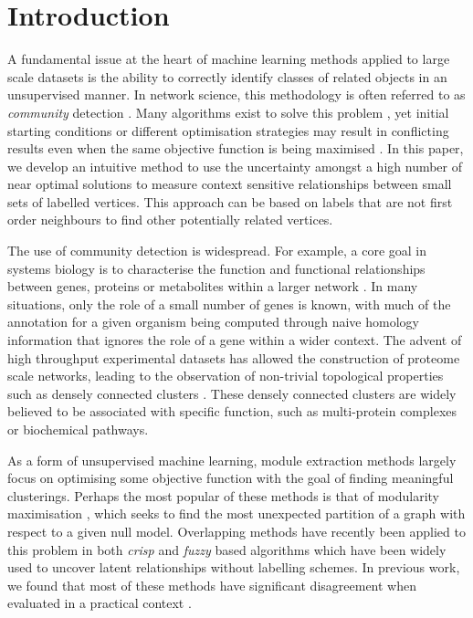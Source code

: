 \documentclass[sigconf]{acmart}
\begin{document}
\section{Introduction}
A fundamental issue at the heart of machine learning methods applied to large scale datasets is the ability to correctly identify classes of related objects in an unsupervised manner.
In network science, this methodology is often referred to as \textit{community} detection \cite{fortunato2016community}.
Many algorithms exist to solve this problem \cite{fortunato2016community}, yet initial starting conditions or different optimisation strategies may result in conflicting results even when the same objective function is being maximised \cite{good2010performance}.
In this paper, we develop an intuitive method to use the uncertainty amongst a high number of near optimal solutions to measure context sensitive relationships between small sets of labelled vertices.
This approach can be based on labels that are not first order neighbours to find other potentially related vertices.

The use of community detection is widespread.
For example, a core goal in systems biology is to characterise the function and functional relationships between genes, proteins or metabolites within a larger network \cite{girvan2002community}.
In many situations, only the role of a small number of genes is known, with much of the annotation for a given organism being computed through naive homology information that ignores the role of a gene within a wider context.
The advent of high throughput experimental datasets has allowed the construction of proteome scale networks, leading to the observation of non-trivial topological properties such as densely connected clusters \cite{ArabidopsisConsortium2011}.
These densely connected clusters are widely believed to be associated with specific function, such as multi-protein complexes or biochemical pathways.

As a form of unsupervised machine learning, module extraction methods largely focus on optimising some objective function with the goal of finding meaningful clusterings.
Perhaps the most popular of these methods is that of modularity maximisation \cite{newman2004}, which seeks to find the most unexpected partition of a graph with respect to a given null model.
Overlapping methods have recently been applied to this problem in both \textit{crisp} \cite{ahn2010link, lancichinetti2011finding} and \textit{fuzzy} \cite{gregory2011fuzzy} based algorithms which have been widely used to uncover latent relationships without labelling schemes.
In previous work, we found that most of these methods have significant disagreement when evaluated in a practical context \cite{gilbert2015probabilistic}.
\end{document}
